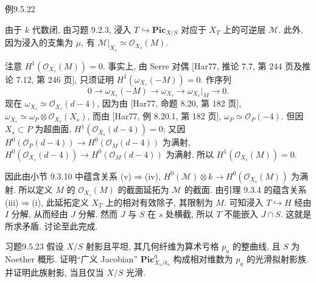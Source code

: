 \begin{origstatement}{例}{9.5.22}

由于 $k$ 代数闭, 由习题 9.2.3, 浸入 $T\hookrightarrow\mathbf{Pic}_{X/S}$ 对应于 $X_T$ 上的可逆层 $\mathcal M$. 此外, 因为浸入的支集为 $\mu$, 有 $\mathcal M|_{X_s}\simeq\mathcal O_{X_s}(M)$.

注意 $H^1(\mathcal O_{X_s}(M))=0$. 事实上, 由 Serre 对偶 [Har77, 推论 7.7, 第 244 页及推论 7.12, 第 246 页], 只须证明 $H^1(\omega_{X_s}(-M))=0$. 作序列
\[
 0\longrightarrow\omega_{X_s}(-M)\longrightarrow\omega_{X_s}
 \longrightarrow\omega_{X_s}|_M\longrightarrow0.
\]
现在 $\omega_{X_s}\simeq\mathcal O_{X_s}(d-4)$, 因为由 [Har77, 命题 8.20, 第 182 页], $\omega_{X_s}\simeq\omega_P\otimes\mathcal O_{X_s}(X_s)$, 而由 [Har77, 例 8.20.1, 第 182 页], $\omega_P\simeq\mathcal O_P(-4)$. 但因 $X_s\subset P$ 为超曲面, $H^1(\mathcal O_{X_s}(d-4))=0$; 又因 $H^0(\mathcal O_P(d-4))\to H^0(\mathcal O_M(d-4))$ 为满射, $H^0(\mathcal O_{X_s}(d-4))\to H^0(\mathcal O_M(d-4))$ 为满射. 所以 $H^1(\mathcal O_{X_s}(M))=0$.

因此由小节 9.3.10 中蕴含关系 (v)$\Rightarrow$(iv), $H^0(\mathcal M)\otimes k\to H^0(\mathcal O_{X_s}(M))$ 为满射. 所以定义 $M$ 的 $\mathcal O_{X_s}(M)$ 的截面延拓为 $\mathcal M$ 的截面. 由引理 9.3.4 的蕴含关系 (iii)$\Rightarrow$(i), 此延拓定义 $X_T$ 上的相对有效除子, 其限制为 $M$. 可知浸入 $T\hookrightarrow H$ 经由 $I$ 分解, 从而经由 $J$ 分解. 然而 $J$ 与 $S$ 在 $s$ 处横截, 所以 $T$ 不能嵌入 $J\cap S$. 这就是所求矛盾. 讨论至此完成.
\end{origstatement}

\begin{origstatement}{习题}{9.5.23}\label{ch09s05:ex9.5.23}
假设 $X/S$ 射影且平坦, 其几何纤维为算术亏格 $p_a$ 的整曲线, 且 $S$ 为 Noether 概形. 证明“广义 Jacobian” $\mathbf{Pic}^0_{X_s/k_s}$ 构成相对维数为 $p_a$ 的光滑拟射影族. 并证明此族射影, 当且仅当 $X/S$ 光滑.
\end{origstatement}

